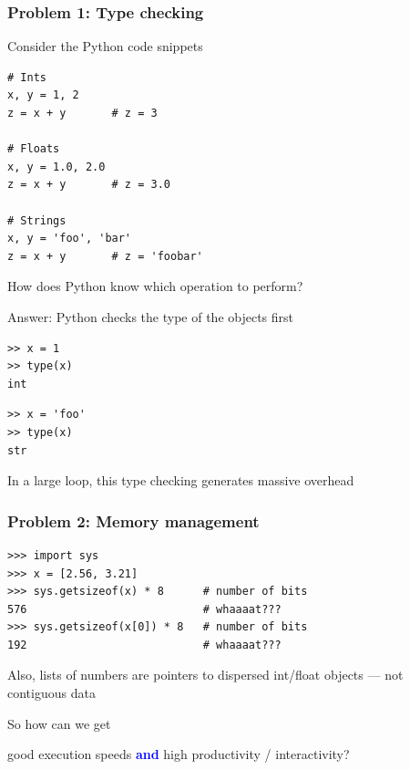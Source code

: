 \documentclass[
    xcolor={svgnames,dvipsnames},
    hyperref={colorlinks, citecolor=DeepPink4, linkcolor=DarkRed, urlcolor=DarkBlue}
    ]{beamer}  %
\newcommand{\navy}[1]{\textcolor{Blue}{\bf #1}}
\newcommand{\1}{\mathbbm 1}
\begin{document}
\begin{frame}[fragile]
    \frametitle{Problem 1: Type checking}

    Consider the Python code snippets

    \begin{verbatim}
# Ints
x, y = 1, 2
z = x + y       # z = 3

# Floats
x, y = 1.0, 2.0
z = x + y       # z = 3.0

# Strings
x, y = 'foo', 'bar'
z = x + y       # z = 'foobar'
    \end{verbatim}



\end{frame}


\begin{frame}[fragile]
    How does Python know which operation to perform?

    Answer: Python checks the type of the objects first

    \begin{verbatim}
>> x = 1
>> type(x)
int
    \end{verbatim}

    \begin{verbatim}
>> x = 'foo'
>> type(x)
str
    \end{verbatim}


    In a large loop, this type checking generates massive overhead
\end{frame}


\begin{frame}[fragile]
    \frametitle{Problem 2: Memory management}

    \begin{verbatim}
>>> import sys
>>> x = [2.56, 3.21]
>>> sys.getsizeof(x) * 8      # number of bits
576                           # whaaaat???
>>> sys.getsizeof(x[0]) * 8   # number of bits
192                           # whaaaat???
    \end{verbatim}


    Also, lists of numbers are pointers to dispersed int/float objects ---
    not contiguous data

\end{frame}


\begin{frame}
    
    So how can we get 

    \begin{center}
    good execution speeds \navy{and} high productivity / interactivity?
    \end{center}

\end{frame}
\end{document}
